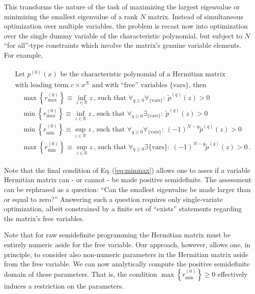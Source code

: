 \documentclass[
  12pt          %
  ,letterpaper  %
  ,center       %
  ,noupper      %
  ,english,fleqn]{uconnthesis}
\newcommand{\LeftEqns}[1]{\begin{fleqn}[\leftmargini minus \leftmargini]\begin{align}#1\end{align}\end{fleqn}}
\newcommand{\LeftEqn}[1]{\LeftEqns{\begin{split}#1\end{split}}}
\newcommand{\ceq}[1]{Eq.\,(\ref{#1})}
\begin{document}
This transforms the nature of the task of maximizing the largest eigenvalue or minimizing the smallest eigenvalue of a rank $N$ matrix. Instead of simultaneous optimization over multiple variables, the problem is recast now into optimization over the single dummy variable of the characteristic polynomial, but subject to $N$ ``for all''-type constraints which involve the matrix's genuine variable elements. For example,
\LeftEqn{\label{eq:minmax}
&\text{Let } p^{(0)}(x) \text{ be the characteristic polynomial of a Hermitian matrix}
\\&\text{with leading term $c \times x^N$ and with ``free'' variables $\{\mbox{vars}\}$, then}
\\&\quad \max{\left\{r^{(0)}_{\max{}}\right\}} \equiv \inf_{z\in \mathbb{R}}z\,  \text{, such that } \forall_{q\geq 0} \forall_{\{\mbox{vars}\}}:\: \tilde{p}^{(q)}(z) > 0
\\&\quad \min{\left\{r^{(0)}_{\max{}}\right\}} \equiv \inf_{z\in \mathbb{R}}z\, { \text{, such that } \forall_{q\geq 0}\exists_{\{\mbox{vars}\}}:\: \tilde{p}^{(q)}(z) > 0}
\\&\quad \min{\left\{r^{(0)}_{\min{}}\right\}} \equiv \sup_{z\in \mathbb{R}}z\, { \text{, such that } \forall_{q\geq 0}\forall_{\{\mbox{vars}\}}:\: (-1)^{N-q}\tilde{p}^{(q)}(z) > 0}
\\&\quad \max{\left\{r^{(0)}_{\min{}}\right\}} \equiv \sup_{z\in \mathbb{R}}z\, { \text{, such that } \forall_{q\geq 0}\exists{\{\mbox{vars}\}}:\: (-1)^{N-q}\tilde{p}^{(q)}(z) > 0}\,.
}
Note that the final condition of \ceq{eq:minmax} allows one to asses if a variable Hermitian matrix can - or cannot - be made positive semidefinite. The assessment can be rephrased as a question: ``Can the smallest eigenvalue be made larger than or equal to zero?'' Answering such a question requires only single-variate optimization, albeit constrained by a finite set of ``exists'' statements regarding the matrix's free variables. 

Note that for raw semidefinite programming the Hermitian matrix must be entirely numeric aside for the free variable. Our approach, however, allows one, in principle, to consider also non-numeric parameters in the Hermitian matrix aside from the free variable. We can now analytically compute the positive semidefinite domain of these parameters. That is, the condition $\max{\left\{r^{(0)}_{\min{}}\right\}}\geq 0$ effectively induces a restriction on the parameters.
\end{document}

